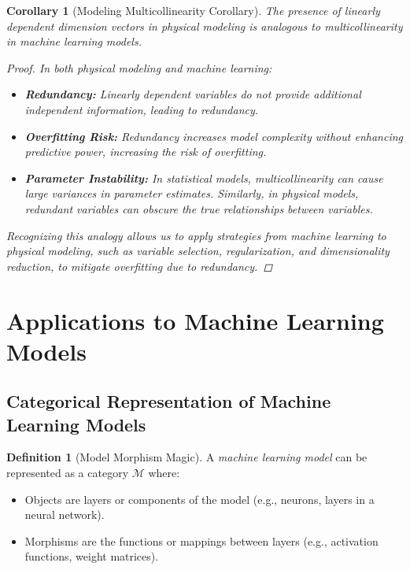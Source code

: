 \documentclass{article}
\newtheorem{corollary}{Corollary}[theorem]
\theoremstyle{definition}
\newtheorem{definition}{Definition}[section]
\theoremstyle{remark}
\begin{document}
	\begin{corollary}[Modeling Multicollinearity Corollary]
		The presence of linearly dependent dimension vectors in physical modeling is analogous to multicollinearity in machine learning models.
		
		\begin{proof}
			In both physical modeling and machine learning:
			\begin{itemize}
				\item \textbf{Redundancy:} Linearly dependent variables do not provide additional independent information, leading to redundancy.
				\item \textbf{Overfitting Risk:} Redundancy increases model complexity without enhancing predictive power, increasing the risk of overfitting.
				\item \textbf{Parameter Instability:} In statistical models, multicollinearity can cause large variances in parameter estimates. Similarly, in physical models, redundant variables can obscure the true relationships between variables.
			\end{itemize}
			
			Recognizing this analogy allows us to apply strategies from machine learning to physical modeling, such as variable selection, regularization, and dimensionality reduction, to mitigate overfitting due to redundancy.
		\end{proof}
	\end{corollary}
	
	\section{Applications to Machine Learning Models}
	
	\subsection{Categorical Representation of Machine Learning Models}
	
	\begin{definition}[Model Morphism Magic]
		A \emph{machine learning model} can be represented as a category $\mathcal{M}$ where:
		\begin{itemize}
			\item Objects are layers or components of the model (e.g., neurons, layers in a neural network).
			\item Morphisms are the functions or mappings between layers (e.g., activation functions, weight matrices).
		\end{itemize}
	\end{definition}
	
\end{document}
